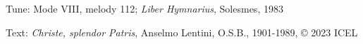 

\begin{hymnsource}
Tune: Mode VIII, melody 112; \emph{Liber Hymnarius}, Solesmes, 1983

Text: \emph{Christe, splendor Patris}, Anselmo Lentini, O.S.B., 1901-1989, © 2023 ICEL
\end{hymnsource}
